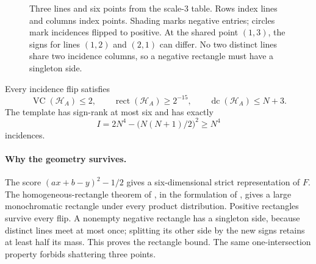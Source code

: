 \documentclass[11pt,letterpaper,pmlr,twoside]{jmlr}
\newcommand{\Hc}{\mathcal H}
\newcommand{\dc}{\operatorname{dc}}
\newcommand{\rect}{\operatorname{rect}}
\newcommand{\VC}{\operatorname{VC}}
\begin{document}
\begin{figure}[t]
\caption{Three lines and six points from the scale-$3$ table. Rows index lines and columns index points. Shading marks negative entries; circles mark incidences flipped to positive. At the shared point $(1,3)$, the signs for lines $(1,2)$ and $(2,1)$ can differ. No two distinct lines share two incidence columns, so a negative rectangle must have a singleton side.}
\label{fig:incidence}
\end{figure}



\begin{proposition}\label{prop:geometry}
Every incidence flip satisfies
\begin{equation}
 \VC(\Hc_A)\le2,\qquad \rect(\Hc_A)\ge2^{-15},\qquad \dc(\Hc_A)\le N+3.
 \label{eq:geometry}
\end{equation}
The template has sign-rank at most six and has exactly
\begin{equation}
 I=2N^4-\bigl(N(N+1)/2\bigr)^2\ge N^4
 \label{eq:incidencecount}
\end{equation}
incidences.
\end{proposition}

\paragraph{Why the geometry survives.}
The score $(ax+b-y)^2-1/2$ gives a six-dimensional strict representation of $F$. The homogeneous-rectangle theorem of \citet{APP05}, in the formulation of \citet[Theorem~1.9]{HHPTZ22}, gives a large monochromatic rectangle under every product distribution. Positive rectangles survive every flip. A nonempty negative rectangle has a singleton side, because distinct lines meet at most once; splitting its other side by the new signs retains at least half its mass. This proves the rectangle bound. The same one-intersection property forbids shattering three points.
\end{document}

